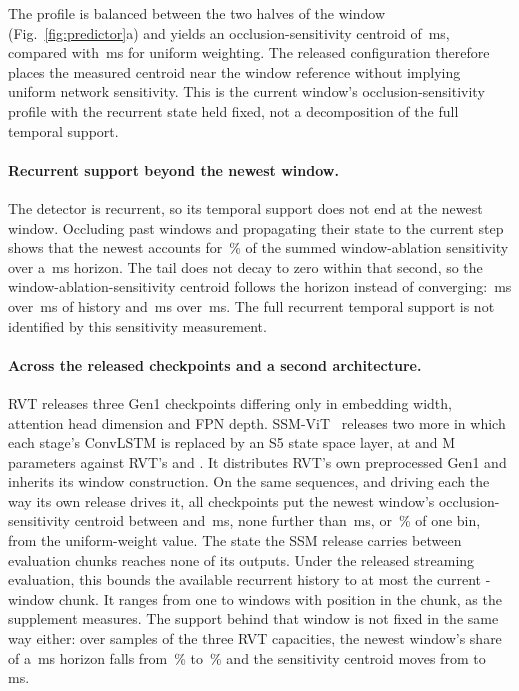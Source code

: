 \documentclass[10pt,twocolumn,letterpaper]{article}
\begin{document}
The profile is balanced between the two halves of the window (Fig.~\ref{fig:predictor}a)
and yields an occlusion-sensitivity centroid of \rvtCentroidMeas\,ms, compared
with \rvtCentroidUnif\,ms for uniform weighting. The released configuration
therefore places the measured centroid near the window reference without implying
uniform network sensitivity.
This is the current window's occlusion-sensitivity profile with the recurrent
state held fixed, not a decomposition of the full temporal support.

\paragraph{Recurrent support beyond the newest window.}
The detector is recurrent, so its temporal support does not end at the newest window. Occluding
past windows and propagating their state to the current step shows that the
newest accounts for \histShareTwenty\,\% of the summed window-ablation sensitivity
over a \histHorizonB\,ms horizon.
The tail does not decay to zero within that second, so
the window-ablation-sensitivity centroid follows the horizon instead of converging:
\histCentroidTen\,ms over \histHorizonA\,ms of history and
\histCentroidTwenty\,ms over \histHorizonB\,ms. The full recurrent temporal
support is not identified by this sensitivity measurement.

\paragraph{Across the released checkpoints and a second architecture.}
RVT releases three Gen1 checkpoints differing only in embedding width, attention
head dimension and FPN depth. SSM-ViT~\cite{zubic2024ssm} releases two more in
which each stage's ConvLSTM is replaced by an S5 state space layer, at \ssmParamsS{}
and \ssmParamsB{} M parameters against RVT's \capParamsS{} and \capParamsB{}.
It distributes RVT's own preprocessed Gen1 and inherits its window construction. On the same sequences, and
driving each the way its own release drives it, all \archCkpts{} checkpoints put the
newest window's occlusion-sensitivity centroid between \archHi{} and \archLo\,ms, none further than
\archUnifMax\,ms, or \archUnifPct\,\% of one bin, from the uniform-weight value.
The state the SSM release carries between evaluation chunks reaches none of its
outputs. Under the released streaming evaluation, this bounds the available
recurrent history to at most the current \ssmEvalChunk{}-window chunk. It ranges
from one to \ssmEvalChunk{} windows with position in the chunk, as the supplement
measures. The support behind that
window is not fixed in the same way either: over \capSamples{} samples of the
three RVT capacities, the newest window's share of a \capHorizon\,ms horizon
falls from \capShareT\,\% to \capShareB\,\% and the sensitivity centroid moves
from \capSuppT{} to \capSuppB\,ms.
\end{document}
